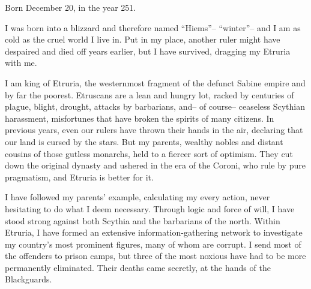 \documentclass[char]{Kos}
\begin{document}
\name{\cEtruriaKing{}}

Born December 20, in the year 251.

I was born into a blizzard and therefore named ``Hiems''-- ``winter''-- and I am as cold as the cruel world I live in. Put in my place, another ruler might have despaired and died off years earlier, but I have survived, dragging my Etruria with me.

I am king of Etruria, the westernmost fragment of the defunct Sabine empire and by far the poorest. Etruscans are a lean and hungry lot, racked by centuries of plague, blight, drought, attacks by barbarians, and-- of course-- ceaseless Scythian harassment, misfortunes that have broken the spirits of many citizens. In previous years, even our rulers have thrown their hands in the air, declaring that our land is cursed by the stars. But my parents, wealthy nobles and distant cousins of those gutless monarchs, held to a fiercer sort of optimism. They cut down the original dynasty and ushered in the era of the Coroni, who rule by pure pragmatism, and Etruria is better for it.

I have followed my parents' example, calculating my every action, never hesitating to do what I deem necessary. Through logic and force of will, I have stood strong against both Scythia and the barbarians of the north. Within Etruria, I have formed an extensive information-gathering network to investigate my country's most prominent figures, many of whom are corrupt. I send most of the offenders to prison camps, but three of the most noxious have had to be more permanently eliminated. Their deaths came secretly, at the hands of the Blackguards.
\end{document}
